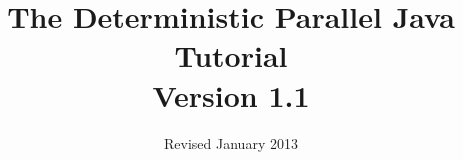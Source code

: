 \documentclass[10pt]{article}
\title{\bfseries{The Deterministic Parallel Java 
    Tutorial \\
Version 1.1}}
\date{Revised January 2013}
\begin{document}
\maketitle

\tableofcontents{}

\begin{sloppypar}






\end{sloppypar}
\end{document}
